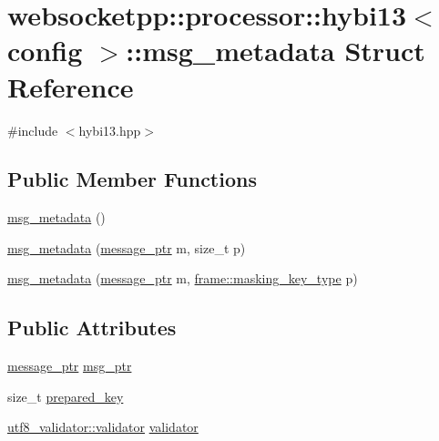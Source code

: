 \hypertarget{structwebsocketpp_1_1processor_1_1hybi13_1_1msg__metadata}{}\section{websocketpp\+:\+:processor\+:\+:hybi13$<$ config $>$\+:\+:msg\+\_\+metadata Struct Reference}
\label{structwebsocketpp_1_1processor_1_1hybi13_1_1msg__metadata}


{\ttfamily \#include $<$hybi13.\+hpp$>$}

\subsection*{Public Member Functions}
\begin{DoxyCompactItemize}
\item 
\hyperlink{structwebsocketpp_1_1processor_1_1hybi13_1_1msg__metadata_abd8448ece130e0e795f25a492d2efa73}{msg\+\_\+metadata} ()
\item 
\hyperlink{structwebsocketpp_1_1processor_1_1hybi13_1_1msg__metadata_a386f3ee3c7e1779a8da19385cf14a418}{msg\+\_\+metadata} (\hyperlink{classwebsocketpp_1_1processor_1_1hybi13_a0571e90d7261ab722f695feb7dd48fed}{message\+\_\+ptr} m, size\+\_\+t p)
\item 
\hyperlink{structwebsocketpp_1_1processor_1_1hybi13_1_1msg__metadata_ad5e5baeb6fe05bea4f6569c3635558f8}{msg\+\_\+metadata} (\hyperlink{classwebsocketpp_1_1processor_1_1hybi13_a0571e90d7261ab722f695feb7dd48fed}{message\+\_\+ptr} m, \hyperlink{namespacewebsocketpp_1_1frame_a8bdac8ec44c78c027fcf55aa3bad3f86}{frame\+::masking\+\_\+key\+\_\+type} p)
\end{DoxyCompactItemize}
\subsection*{Public Attributes}
\begin{DoxyCompactItemize}
\item 
\hyperlink{classwebsocketpp_1_1processor_1_1hybi13_a0571e90d7261ab722f695feb7dd48fed}{message\+\_\+ptr} \hyperlink{structwebsocketpp_1_1processor_1_1hybi13_1_1msg__metadata_a49e276abf3be14de45a9111cb13e3d81}{msg\+\_\+ptr}
\item 
size\+\_\+t \hyperlink{structwebsocketpp_1_1processor_1_1hybi13_1_1msg__metadata_a4c0cf4af697b0a12396ca5570a888ec1}{prepared\+\_\+key}
\item 
\hyperlink{classwebsocketpp_1_1utf8__validator_1_1validator}{utf8\+\_\+validator\+::validator} \hyperlink{structwebsocketpp_1_1processor_1_1hybi13_1_1msg__metadata_a283c8d119c2c9f2543a2247b465c9416}{validator}
\end{DoxyCompactItemize}


